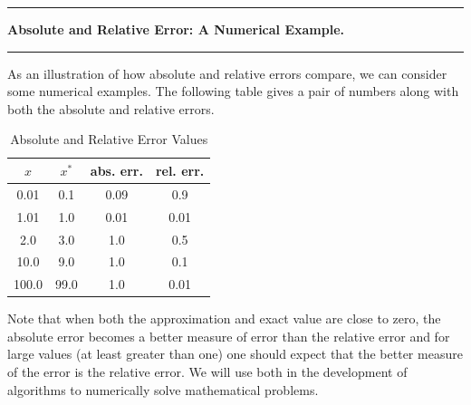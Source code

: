 \documentclass[10pt,fleqn]{article}
\begin{document}
\vskip0.1in\hrule\vskip0.1in \noindent
{\bf Absolute and Relative Error: A Numerical Example.} 
\vskip0.1in\hrule\vskip0.1in \noindent
As an illustration of how absolute and relative errors compare, we can consider
some numerical examples. The following table gives a pair of numbers along with
both the absolute and relative errors.

\begin{table}[h!]
   \caption{Absolute and Relative Error Values}
   \begin{center}
   \begin{tabular}{c|c|c|c}
     \hline
     \textbf{$x$} & \textbf{$x^*$} & \textbf{abs. err.} & \textbf{rel. err.} \\
     \hline
     0.01 & 0.1 & 0.09 & 0.9 \\
     \hline
     1.01 & 1.0 & 0.01 & 0.01 \\
     \hline
     2.0   & 3.0  & 1.0 & 0.5 \\
     \hline
     10.0  & 9.0  & 1.0 & 0.1 \\
     \hline
     100.0 & 99.0 & 1.0 & 0.01 \\
     \hline
   \end{tabular}
   \end{center}
\end{table}

Note that when both the approximation and exact value are close to zero, the
absolute error becomes a better measure of error than the relative error and
for large values (at least greater than one) one should expect that the better
measure of the error is the relative error. We will use both in the development
of algorithms to numerically solve mathematical problems.
\end{document}
